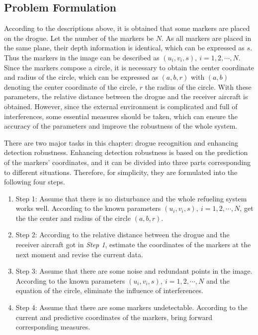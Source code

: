 \subsection{Problem Formulation}

According to the descriptions above, it is obtained that some markers are
placed on the drogue. Let the number of the markers be $N$. As all markers
are placed in the same plane, their depth information is identical, which
can be expressed as $s$. Thus the markers in the image can be described as $%
(u_{i},v_{i},s),\ i=1,2,\cdots,N$. Since the markers compose a circle, it
is necessary to obtain the center coordinate and radius of the circle, which
can be expressed as $(a,b,r)$ with $(a,b)$ denoting the center coordinate of the circle, $r$ the radius of
the circle. With these parameters, the relative distance
between the drogue and the receiver aircraft is obtained. However, since the external environment is complicated and full of interferences, some
essential measures should be taken, which can ensure the accuracy of the
parameters and improve the robustness of the whole system.

There are two major tasks in this chapter: drogue recognition and enhancing
detection robustness. Enhancing detection robustness is based on the prediction of
the markers' coordinates, and it can be divided into three parts corresponding to
different situations. Therefore, for simplicity, they are formulated into
the following four steps.
\begin{enumerate}[1)]
	\item Step 1: Assume that there is no disturbance and the whole refueling system works well. According to the known parameters $(u_{i},v_{i},s),\ i=1,2,\cdots,N$, get the the center and radius of the circle $(a,b,r)$.
	
	\item Step 2: According to the relative distance between the drogue and the receiver aircraft got in \textit{Step 1}, estimate the coordinates of the markers at the next moment and revise the current data.
	
	\item Step 3: Assume that there are some noise and redundant points in the image. According to the known parameters $(u_{i},v_{i},s),\ i=1,2,\cdots,N$ and the equation of the circle, eliminate the influence of interferences.
	
	\item Step 4: Assume that there are some markers undetectable. According to the current and predictive coordinates of the markers, bring forward corresponding measures.
\end{enumerate}

